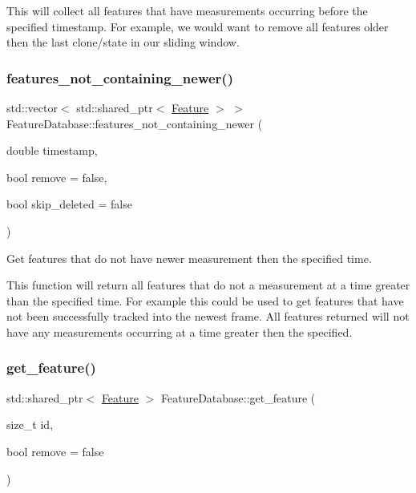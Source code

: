 This will collect all features that have measurements occurring before the specified timestamp. For example, we would want to remove all features older then the last clone/state in our sliding window. \mbox{\label{classov__core_1_1FeatureDatabase_a4f6d8da846e81eac1faa3c7abd7f44a7}} 
\subsubsection{\texorpdfstring{features\+\_\+not\+\_\+containing\+\_\+newer()}{features\_not\_containing\_newer()}}
{\footnotesize\ttfamily std\+::vector$<$ std\+::shared\+\_\+ptr$<$ \hyperlink{classov__core_1_1Feature}{Feature} $>$ $>$ Feature\+Database\+::features\+\_\+not\+\_\+containing\+\_\+newer (\begin{DoxyParamCaption}\item[{double}]{timestamp,  }\item[{bool}]{remove = {\ttfamily false},  }\item[{bool}]{skip\+\_\+deleted = {\ttfamily false} }\end{DoxyParamCaption})}



Get features that do not have newer measurement then the specified time. 

This function will return all features that do not a measurement at a time greater than the specified time. For example this could be used to get features that have not been successfully tracked into the newest frame. All features returned will not have any measurements occurring at a time greater then the specified. \mbox{\label{classov__core_1_1FeatureDatabase_a3c7b5ef425c785eb3c160e995c545f87}} 
\subsubsection{\texorpdfstring{get\+\_\+feature()}{get\_feature()}}
{\footnotesize\ttfamily std\+::shared\+\_\+ptr$<$ \hyperlink{classov__core_1_1Feature}{Feature} $>$ Feature\+Database\+::get\+\_\+feature (\begin{DoxyParamCaption}\item[{size\+\_\+t}]{id,  }\item[{bool}]{remove = {\ttfamily false} }\end{DoxyParamCaption})}



